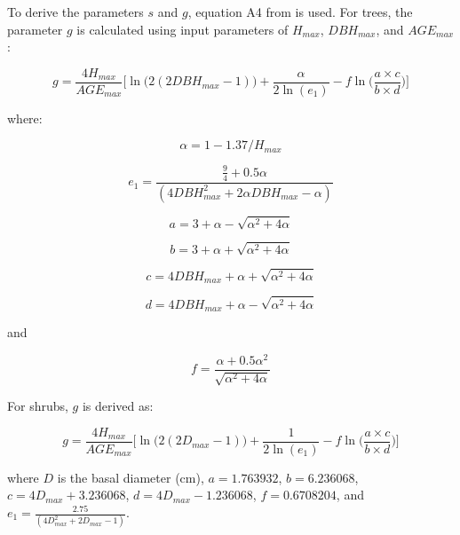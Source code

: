 \documentclass[a4paper, 12pt] {article}
\begin{document}
To derive the parameters $s$ and $g$, equation A4 from   is used. For trees, the parameter $g$ is calculated using input parameters of $H_{max}$, $DBH_{max}$, and $AGE_{max}$:

\begin{equation} \label{gderiv}
g = \frac{4H_{max}}{AGE_{max}}\Bigg[\ln\Big(2(2DBH_{max} - 1)\Big) + \frac{\alpha}{2\ln(e_1)} - f\ln\Big(\frac{a \times c}{b \times d}\Big)\Bigg]
\end{equation}

where:

\begin{equation}
\alpha  =  1 - 1.37/H_{max}
\end{equation}

\begin{equation}
e_1 = \frac{\frac{9}{4} + 0.5\alpha}{(4DBH^2_{max} + 2\alpha DBH_{max}-\alpha)}
\end{equation}

\begin{equation}
a = 3 + \alpha - \sqrt{\alpha^2 + 4\alpha}
\end{equation}

\begin{equation}
 b = 3 + \alpha + \sqrt{\alpha^2 + 4\alpha}
\end{equation}

\begin{equation}
 c = 4DBH_{max} + \alpha + \sqrt{\alpha^2 + 4\alpha}
\end{equation}

\begin{equation}
d = 4DBH_{max} + \alpha - \sqrt{\alpha^2 + 4\alpha}
\end{equation}

and 

\begin{equation}
 f = \frac{\alpha + 0.5\alpha^2}{\sqrt{\alpha^2 + 4\alpha}}
\end{equation}

For shrubs, $g$ is derived as:

\begin{equation} \label{eq:gderiv_s}
	g = \frac{4H_{max}}{AGE_{max}}\Bigg[\ln\Big(2(2D_{max} - 1)\Big) + \frac{1}{2\ln(e_1)} - f\ln\Big(\frac{a \times c}{b \times d}\Big)\Bigg]
\end{equation}

where $D$ is the basal diameter (cm), $a = 1.763932$, $b = 6.236068$,  $c = 4D_{max} +  3.236068$, $d = 4D_{max} -1.236068$,
$f = 0.6708204$, and $e_1 = \frac{2.75}{(4D^2_{max} + 2D_{max}-1)}$.
\end{document}
